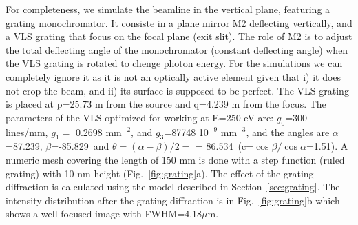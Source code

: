 \documentclass{iucr}              %
\begin{document}
For completeness, we simulate the beamline in the vertical plane, featuring a grating monochromator. It consiste in a plane mirror M2 deflecting vertically, and a VLS grating that focus on the focal plane (exit slit). The role of M2 is to adjust the total deflecting angle of the monochromator (constant deflecting angle) when the VLS grating is rotated to chenge photon energy. For the simulations we can completely ignore it as it is not an optically active element given that i) it does not crop the beam, and ii) its surface is supposed to be perfect. The VLS grating is placed at p=25.73 m from the source and q=4.239 m from the focus. The parameters of the VLS optimized for working at E=250 eV are: $g_0$=300 lines/mm, $g_1=$  0.2698 mm$^{-2}$, and $g_3$=87748 10${^{-9}}$ mm$^{-3}$, and the angles are $\alpha$=87.239\textdegree, $\beta$=-85.829\textdegree ~and $\theta=(\alpha-\beta)/2=$ = 86.534\textdegree ~(c=$\cos \beta / \cos \alpha$=1.51). A numeric mesh covering the length of 150 mm is done with a step function (ruled grating) with 10 nm height (Fig.~\ref{fig:grating}a). The effect of the grating diffraction is calculated using the model described in Section~\ref{sec:grating}. The intensity distribution after the grating diffraction is in Fig.~\ref{fig:grating}b which shows a well-focused image with FWHM=4.18$\mu$m.
\end{document}
